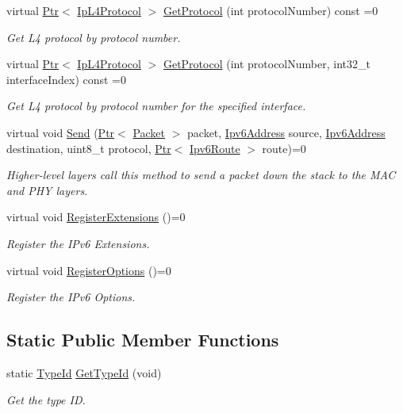 \begin{DoxyCompactItemize}
virtual \hyperlink{classns3_1_1Ptr}{Ptr}$<$ \hyperlink{classns3_1_1IpL4Protocol}{Ip\+L4\+Protocol} $>$ \hyperlink{classns3_1_1Ipv6_aef0e6be6a6def36087298f48e0b235a3}{Get\+Protocol} (int protocol\+Number) const =0
\begin{DoxyCompactList}\small\item\em Get L4 protocol by protocol number. \end{DoxyCompactList}\item 
virtual \hyperlink{classns3_1_1Ptr}{Ptr}$<$ \hyperlink{classns3_1_1IpL4Protocol}{Ip\+L4\+Protocol} $>$ \hyperlink{classns3_1_1Ipv6_a8fa557713b63afce0b11b720d6e639d4}{Get\+Protocol} (int protocol\+Number, int32\+\_\+t interface\+Index) const =0
\begin{DoxyCompactList}\small\item\em Get L4 protocol by protocol number for the specified interface. \end{DoxyCompactList}\item 
virtual void \hyperlink{classns3_1_1Ipv6_a2aad308983b20eb54334bb0d3db31004}{Send} (\hyperlink{classns3_1_1Ptr}{Ptr}$<$ \hyperlink{classns3_1_1Packet}{Packet} $>$ packet, \hyperlink{classns3_1_1Ipv6Address}{Ipv6\+Address} source, \hyperlink{classns3_1_1Ipv6Address}{Ipv6\+Address} destination, uint8\+\_\+t protocol, \hyperlink{classns3_1_1Ptr}{Ptr}$<$ \hyperlink{classns3_1_1Ipv6Route}{Ipv6\+Route} $>$ route)=0
\begin{DoxyCompactList}\small\item\em Higher-\/level layers call this method to send a packet down the stack to the M\+AC and P\+HY layers. \end{DoxyCompactList}\item 
virtual void \hyperlink{classns3_1_1Ipv6_a57bd0dd1c4b1b9bb63b748124a548fe5}{Register\+Extensions} ()=0
\begin{DoxyCompactList}\small\item\em Register the I\+Pv6 Extensions. \end{DoxyCompactList}\item 
virtual void \hyperlink{classns3_1_1Ipv6_a95905b14fff6edf0c4de70f47f6312cb}{Register\+Options} ()=0
\begin{DoxyCompactList}\small\item\em Register the I\+Pv6 Options. \end{DoxyCompactList}\end{DoxyCompactItemize}
\subsection*{Static Public Member Functions}
\begin{DoxyCompactItemize}
\item 
static \hyperlink{classns3_1_1TypeId}{Type\+Id} \hyperlink{classns3_1_1Ipv6_a286c4af336a746ceb5cfd655da1a42dd}{Get\+Type\+Id} (void)
\begin{DoxyCompactList}\small\item\em Get the type ID. \end{DoxyCompactList}\end{DoxyCompactItemize}
